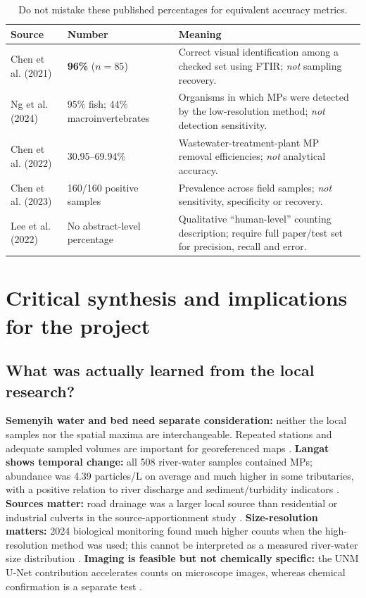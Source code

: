 \documentclass[10pt,a4paper]{article}
\begin{document}
\begin{table}[H]\centering\small\caption{Do not mistake these published percentages for equivalent accuracy metrics.}\label{tab:metrics}
\begin{tabularx}{\linewidth}{@{}p{3.3cm}p{2.6cm}X@{}}\toprule
Source & Number & Meaning\\\midrule
Chen et al. (2021) \cite{Corpus20} & \textbf{96\%} ($n=85$) & Correct visual identification among a checked set using FTIR; \emph{not} sampling recovery.\\
Ng et al. (2024) \cite{Corpus24} & 95\% fish; 44\% macroinvertebrates & Organisms in which MPs were detected by the low-resolution method; \emph{not} detection sensitivity.\\
Chen et al. (2022) \cite{Corpus25} & 30.95--69.94\% & Wastewater-treatment-plant MP removal efficiencies; \emph{not} analytical accuracy.\\
Chen et al. (2023) \cite{Corpus08} & 160/160 positive samples & Prevalence across field samples; \emph{not} sensitivity, specificity or recovery.\\
Lee et al. (2022) \cite{Corpus23} & No abstract-level percentage & Qualitative ``human-level'' counting description; require full paper/test set for precision, recall and error.\\\bottomrule
\end{tabularx}\end{table}

\section{Critical synthesis and implications for the project}
\subsection{What was actually learned from the local research?}
\textbf{Semenyih water and bed need separate consideration:} neither the local samples nor the spatial maxima are interchangeable. Repeated stations and adequate sampled volumes are important for georeferenced maps \cite{Corpus08}. \textbf{Langat shows temporal change:} all 508 river-water samples contained MPs; abundance was 4.39 particles/L on average and much higher in some tributaries, with a positive relation to river discharge and sediment/turbidity indicators \cite{Corpus20}. \textbf{Sources matter:} road drainage was a larger local source than residential or industrial culverts in the source-apportionment study \cite{Corpus25}. \textbf{Size-resolution matters:} 2024 biological monitoring found much higher counts when the high-resolution method was used; this cannot be interpreted as a measured river-water size distribution \cite{Corpus24}. \textbf{Imaging is feasible but not chemically specific:} the UNM U-Net contribution accelerates counts on microscope images, whereas chemical confirmation is a separate test \cite{Corpus23,Corpus20}.
\end{document}
